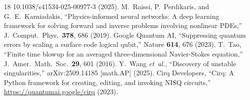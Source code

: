 \documentclass[10pt,letterpaper]{article}
\begin{document}
\begin{thebibliography}{18}
  {10.1038/s41534-025-00977-3} (2025).
  M.~Raissi, P.~Perdikaris, and G.~E.~Karniadakis,
  ``Physics-informed neural networks: A deep learning framework for
  solving forward and inverse problems involving nonlinear PDEs,''
  J.\ Comput.\ Phys.\ \textbf{378}, 686 (2019).
  Google Quantum AI,
  ``Suppressing quantum errors by scaling a surface code logical qubit,''
  Nature \textbf{614}, 676 (2023).
  T.~Tao,
  ``Finite time blowup for an averaged three-dimensional
  Navier-Stokes equation,''
  J.\ Amer.\ Math.\ Soc.\ \textbf{29}, 601 (2016).
  Y.~Wang \textit{et~al.},
  ``Discovery of unstable singularities,''
  arXiv:2509.14185 [math.AP] (2025).
  Cirq Developers,
  ``Cirq: A Python framework for creating, editing, and invoking NISQ
  circuits,'' \url{https://quantumai.google/cirq} (2023).
\end{thebibliography}
\end{document}

